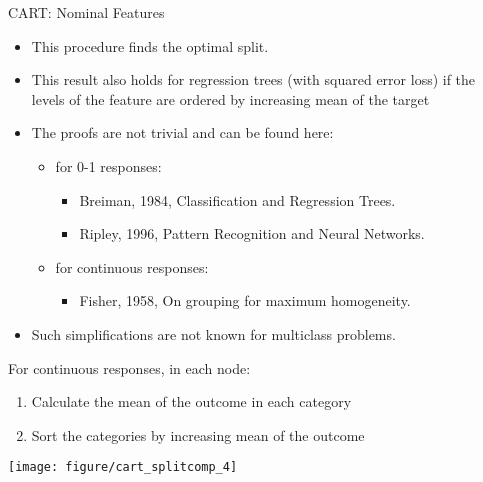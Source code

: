 \begin{vbframe}{CART: Nominal Features}
  \begin{itemize}
  \item This procedure finds the optimal split.
  \item This result also holds for regression trees (with squared error loss) if the levels of the feature are ordered by increasing mean of the target
  \item The proofs are not trivial and can be found here:
    \begin{itemize}
    \item for 0-1 responses:
      \begin{itemize}
      \item Breiman, 1984, Classification and Regression Trees.
      \item Ripley, 1996, Pattern Recognition and Neural Networks.
      \end{itemize}
    \item for continuous responses:
      \begin{itemize}
      \item Fisher, 1958, On grouping for maximum homogeneity.
      \end{itemize}
    \end{itemize}
  \item Such simplifications are not known for multiclass problems.
  \end{itemize}

\pagebreak

For continuous responses, in each node:
  \begin{enumerate}
  \item Calculate the mean of the outcome in each category
  \item Sort the categories by increasing mean of the outcome
  \end{enumerate}

\vspace{0.3cm}

\begin{knitrout}\scriptsize
{}\color{fgcolor}

{\centering \texttt{[image: figure/cart\_splitcomp\_4]} 

}



\end{knitrout}
\end{vbframe}

